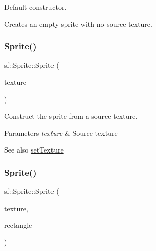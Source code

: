 Default constructor. 

Creates an empty sprite with no source texture. \begin{DoxyVerb}\end{DoxyVerb}
 \mbox{\label{classsf_1_1_sprite_a2a9fca374d7abf084bb1c143a879ff4a}} 
\subsubsection{\texorpdfstring{Sprite()}{Sprite()}\hspace{0.1cm}{\footnotesize\ttfamily [2/3]}}
{\footnotesize\ttfamily sf\+::\+Sprite\+::\+Sprite (\begin{DoxyParamCaption}\item[{const \mbox{\hyperlink{classsf_1_1_texture}{Texture}} \&}]{texture }\end{DoxyParamCaption})\hspace{0.3cm}{\ttfamily [explicit]}}



Construct the sprite from a source texture. 


\begin{DoxyParams}{Parameters}
{\em texture} & Source texture\\
\hline
\end{DoxyParams}
\begin{DoxySeeAlso}{See also}
\mbox{\hyperlink{classsf_1_1_sprite_a3729c88d88ac38c19317c18e87242560}{set\+Texture}} \begin{DoxyVerb}\end{DoxyVerb}
 
\end{DoxySeeAlso}
\mbox{\label{classsf_1_1_sprite_a01cfe1402372d243dbaa2ffa96020206}} 
\subsubsection{\texorpdfstring{Sprite()}{Sprite()}\hspace{0.1cm}{\footnotesize\ttfamily [3/3]}}
{\footnotesize\ttfamily sf\+::\+Sprite\+::\+Sprite (\begin{DoxyParamCaption}\item[{const \mbox{\hyperlink{classsf_1_1_texture}{Texture}} \&}]{texture,  }\item[{const \mbox{\hyperlink{classsf_1_1_rect}{Int\+Rect}} \&}]{rectangle }\end{DoxyParamCaption})}



